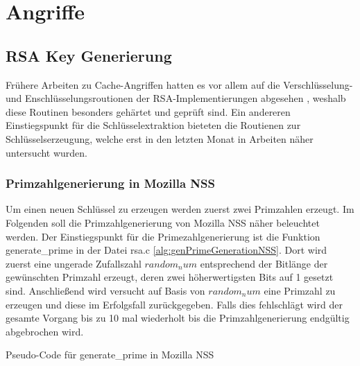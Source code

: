 \chapter{Angriffe}
\label{chapter:results}

\section{RSA Key Generierung}

Frühere Arbeiten zu Cache-Angriffen hatten es vor allem auf die Verschlüsselung- und Enschlüsselungsroutionen der RSA-Implementierungen abgesehen \TODO \cite{}, weshalb diese Routinen besonders gehärtet und geprüft sind.
Ein andereren Einstiegspunkt für die Schlüsselextraktion bieteten die Routienen zur Schlüsselserzeugung, welche erst in den letzten Monat in Arbeiten näher untersucht wurden.

\subsection{Primzahlgenerierung in Mozilla NSS}

Um einen neuen Schlüssel zu erzeugen werden zuerst zwei Primzahlen erzeugt. Im Folgenden soll die Primzahlgenerierung von Mozilla NSS näher beleuchtet werden.
Der Einstiegspunkt für die Primezahlgenerierung ist die Funktion generate_prime in der Datei rsa.c \ref{alg:genPrimeGenerationNSS}.
Dort wird zuerst eine ungerade Zufallszahl $random_num$ entsprechend der Bitlänge der gewünschten Primzahl erzeugt, deren zwei höherwertigsten Bits auf 1 gesetzt sind.
Anschließend wird versucht auf Basis von $random_num$ eine Primzahl zu erzeugen und diese im Erfolgsfall zurückgegeben.
Falls dies fehlschlägt wird der gesamte Vorgang bis zu 10 mal wiederholt bis die Primzahlgenerierung endgültig abgebrochen wird.

\begin{algorithm}[h]
\DontPrintSemicolon
\caption{Pseudo-Code für generate_prime in Mozilla NSS}
\label{alg:genPrimeGenerationNSS}

\end{algorithm}

